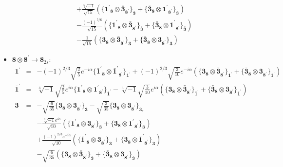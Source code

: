 \documentclass[english]{article}
\newcommand{\subcg}[3]{\big\{ {#1}\otimes{#2}\big\}^{}_{#3}}
\newcommand{\rep}[1]{\mathbf{#1}}
\begin{document}
\begin{itemize}
\begin{eqnarray*}
 & & +\frac{\sqrt[6]{-1}}{\sqrt{15}}\left(\subcg{\rep{1^{\prime}}_{\rep{8}}}{\rep{\bar{3}}_{\rep{8^{\prime}}}}{\rep{\bar{3}}}+\subcg{\rep{\bar{3}}_{\rep{8}}}{\rep{1^{\prime}}_{\rep{8^{\prime}}}}{\rep{\bar{3}}}\right) \\ 
 & & -\frac{(-1)^{5/6}}{\sqrt{15}}\left(\subcg{\rep{\bar{1}^{\prime}}_{\rep{8}}}{\rep{\bar{3}}_{\rep{8^{\prime}}}}{\rep{\bar{3}}}+\subcg{\rep{\bar{3}}_{\rep{8}}}{\rep{\bar{1}^{\prime}}_{\rep{8^{\prime}}}}{\rep{\bar{3}}}\right) \\ 
 & & -\frac{1}{\sqrt{15}}\left(\subcg{\rep{3}_{\rep{8}}}{\rep{\bar{3}}_{\rep{8^{\prime}}}}{\rep{\bar{3}}}+\subcg{\rep{\bar{3}}_{\rep{8}}}{\rep{3}_{\rep{8^{\prime}}}}{\rep{\bar{3}}}\right)
\end{eqnarray*}
\item $\rep{8}\otimes\rep{8^{\prime}}\to\rep{8}_{2s}$:
\begin{eqnarray*}
\rep{1^{\prime}} &=& -(-1)^{2/3} \sqrt{\frac{2}{5}} e^{-i \alpha }\subcg{\rep{\bar{1}^{\prime}}_{\rep{8}}}{\rep{\bar{1}^{\prime}}_{\rep{8^{\prime}}}}{\rep{1^{\prime}}}+(-1)^{2/3} \sqrt{\frac{3}{10}} e^{-i \alpha }\left(\subcg{\rep{3}_{\rep{8}}}{\rep{\bar{3}}_{\rep{8^{\prime}}}}{\rep{1^{\prime}}}+\subcg{\rep{\bar{3}}_{\rep{8}}}{\rep{3}_{\rep{8^{\prime}}}}{\rep{1^{\prime}}}\right)
\\
\rep{\bar{1}^{\prime}} &=& \sqrt[3]{-1} \sqrt{\frac{2}{5}} e^{i \alpha }\subcg{\rep{1^{\prime}}_{\rep{8}}}{\rep{1^{\prime}}_{\rep{8^{\prime}}}}{\rep{\bar{1}^{\prime}}}-\sqrt[3]{-1} \sqrt{\frac{3}{10}} e^{i \alpha }\left(\subcg{\rep{3}_{\rep{8}}}{\rep{\bar{3}}_{\rep{8^{\prime}}}}{\rep{\bar{1}^{\prime}}}+\subcg{\rep{\bar{3}}_{\rep{8}}}{\rep{3}_{\rep{8^{\prime}}}}{\rep{\bar{1}^{\prime}}}\right)
\\
\rep{3} &=& -\sqrt{\frac{6}{35}}\subcg{\rep{3}_{\rep{8}}}{\rep{3}_{\rep{8^{\prime}}}}{\rep{3}}-\sqrt{\frac{3}{35}}\subcg{\rep{\bar{3}}_{\rep{8}}}{\rep{\bar{3}}_{\rep{8^{\prime}}}}{\rep{3}_{s}} \\ 
 & & -\frac{\sqrt[3]{-1} e^{i \alpha }}{\sqrt{10}}\left(\subcg{\rep{1^{\prime}}_{\rep{8}}}{\rep{3}_{\rep{8^{\prime}}}}{\rep{3}}+\subcg{\rep{3}_{\rep{8}}}{\rep{1^{\prime}}_{\rep{8^{\prime}}}}{\rep{3}}\right) \\ 
 & & +\frac{(-1)^{2/3} e^{-i \alpha }}{\sqrt{10}}\left(\subcg{\rep{\bar{1}^{\prime}}_{\rep{8}}}{\rep{3}_{\rep{8^{\prime}}}}{\rep{3}}+\subcg{\rep{3}_{\rep{8}}}{\rep{\bar{1}^{\prime}}_{\rep{8^{\prime}}}}{\rep{3}}\right) \\ 
 & & -\sqrt{\frac{6}{35}}\left(\subcg{\rep{3}_{\rep{8}}}{\rep{\bar{3}}_{\rep{8^{\prime}}}}{\rep{3}}+\subcg{\rep{\bar{3}}_{\rep{8}}}{\rep{3}_{\rep{8^{\prime}}}}{\rep{3}}\right)

\end{eqnarray*}
\end{itemize}
\end{document}
